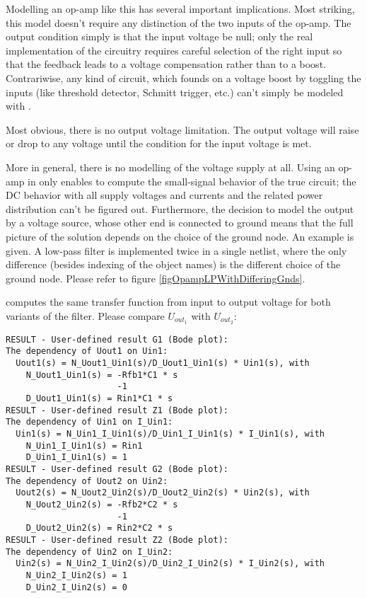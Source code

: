 Modelling an op-amp like this has several important implications. Most
striking, this model doesn't require any distinction of the two inputs of
the op-amp. The output condition simply is that the input voltage be null;
only the real implementation of the circuitry requires careful selection
of the right input so that the feedback leads to a voltage compensation
rather than to a boost. Contrariwise, any kind of circuit, which founds on
a voltage boost by toggling the inputs (like threshold detector, Schmitt
trigger, etc.) can't simply be modeled with \linnet{}.

Most obvious, there is no output voltage limitation. The output voltage
will raise or drop to any voltage until the condition for the input
voltage is met.

More in general, there is no modelling of the voltage supply at all. Using
an op-amp in \linnet{} only enables to compute the small-signal behavior
of the true circuit; the DC behavior with all supply voltages and currents
and the related power distribution can't be figured out. Furthermore, the
decision to model the output by a voltage source, whose other end is
connected to ground means that the full picture of the solution depends on
the choice of the ground node. An example is given. A low-pass filter is
implemented twice in a single netlist, where the only difference (besides
indexing of the object names) is the different choice of the ground
node. Please refer to figure \ref{figOpampLPWithDifferingGnds}.

\linnet{} computes the same transfer function from input to output voltage
for both variants of the filter. Please compare $U_{out_1}$ with
$U_{out_2}$:

\begin{verbatim}
RESULT - User-defined result G1 (Bode plot):
The dependency of Uout1 on Uin1:
  Uout1(s) = N_Uout1_Uin1(s)/D_Uout1_Uin1(s) * Uin1(s), with
    N_Uout1_Uin1(s) = -Rfb1*C1 * s
                      -1
    D_Uout1_Uin1(s) = Rin1*C1 * s
RESULT - User-defined result Z1 (Bode plot):
The dependency of Uin1 on I_Uin1:
  Uin1(s) = N_Uin1_I_Uin1(s)/D_Uin1_I_Uin1(s) * I_Uin1(s), with
    N_Uin1_I_Uin1(s) = Rin1
    D_Uin1_I_Uin1(s) = 1
RESULT - User-defined result G2 (Bode plot):
The dependency of Uout2 on Uin2:
  Uout2(s) = N_Uout2_Uin2(s)/D_Uout2_Uin2(s) * Uin2(s), with
    N_Uout2_Uin2(s) = -Rfb2*C2 * s
                      -1
    D_Uout2_Uin2(s) = Rin2*C2 * s
RESULT - User-defined result Z2 (Bode plot):
The dependency of Uin2 on I_Uin2:
  Uin2(s) = N_Uin2_I_Uin2(s)/D_Uin2_I_Uin2(s) * I_Uin2(s), with
    N_Uin2_I_Uin2(s) = 1
    D_Uin2_I_Uin2(s) = 0
\end{verbatim}

